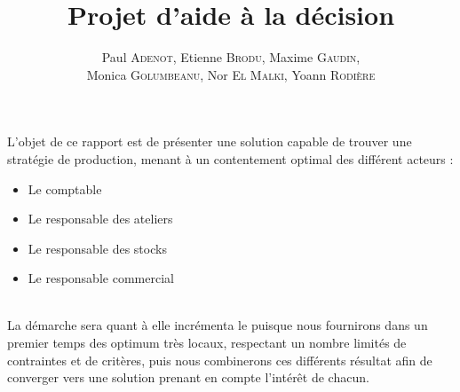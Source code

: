 \documentclass[a4paper,11pt]{article}
\title{\textbf{Projet d'aide à la décision}}
\author{Paul \textsc{Adenot}, Etienne \textsc{Brodu}, Maxime \textsc{Gaudin},\\
Monica \textsc{Golumbeanu}, Nor \textsc{El Malki}, Yoann \textsc{Rodière}}
\begin{document}
\maketitle
{ \footnotesize %
\tableofcontents
}

\begin{nAbstract}
L'objet de ce rapport est de présenter une solution capable de trouver une
stratégie de production, menant à un contentement optimal des différent
acteurs :
\begin{itemize}
  \item Le comptable
  \item Le responsable des ateliers
  \item Le responsable des stocks
  \item Le responsable commercial
\end{itemize}
~\\
La démarche sera quant à elle incrémenta le puisque nous fournirons dans un
premier temps des optimum très locaux, respectant un nombre limités de
contraintes et de critères, puis nous combinerons ces différents résultat afin
de converger vers une solution prenant en compte l'intérêt de chacun.
\end{nAbstract}






\newpage


\graphicspath{{../SourcesMatlab/}}
\graphicspath{{.}}
\end{document}
